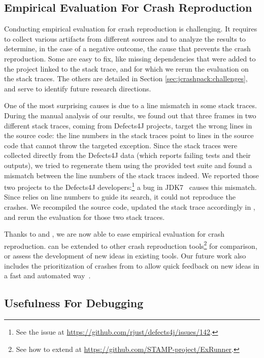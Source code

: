 
\subsection{Empirical Evaluation For Crash Reproduction}

Conducting empirical evaluation for crash reproduction is challenging. It requires to collect various artifacts from different sources and to analyze the results to determine, in the case of a negative outcome, the cause that prevents the crash reproduction. Some are easy to fix, like missing dependencies that were added to the project linked to the stack trace, and for which we rerun the evaluation on the stack traces. The others are detailed in Section \ref{sec:jcrashpack:challenges}, and serve to identify future research directions. 

One of the most surprising causes is due to a line mismatch in some stack traces.
During the manual analysis of our results, we found out that three frames in two different stack traces, coming from Defects4J projects, target the wrong lines in the source code: the line numbers in the stack traces point to lines in the source code that cannot throw the targeted exception.
Since the stack traces were collected directly from the Defects4J data (which reports failing tests and their outputs), we tried to regenerate them using the provided test suite and found a mismatch between the line numbers of the stack traces indeed.
We reported those two projects to the Defects4J developers:\footnote{See the issue at \url{https://github.com/rjust/defects4j/issues/142}.} a bug in JDK7~\cite{JDK7024096} causes this mismatch.
Since \evocrash relies on line numbers to guide its search, it could not reproduce the crashes.
We recompiled the source code, updated the stack trace accordingly in \crashpack, and rerun the evaluation for those two stack traces.

Thanks to \crashpack and \exrunner, we are now able to ease empirical evaluation for crash reproduction. \exrunner can be extended to other crash reproduction tools\footnote{See how to extend \exrunner at \url{https://github.com/STAMP-project/ExRunner}.} for comparison, or assess the development of new ideas in existing tools. Our future work also includes the prioritization of crashes from \crashpack to allow quick feedback on new ideas in a fast and automated way~\cite{Alshahwan2018}.


\subsection{Usefulness For Debugging}


